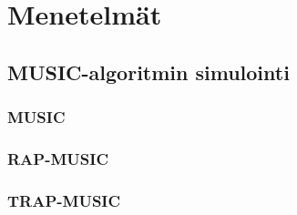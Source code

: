 \section{Menetelmät}

\subsection{MUSIC-algoritmin simulointi}

\subsubsection{MUSIC}

\subsubsection{RAP-MUSIC}

\subsubsection{TRAP-MUSIC}